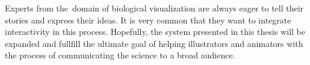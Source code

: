 \documentclass[
  digital, %
  table,   %
  nolof,     %
  nolot,     %
  oneside,
]{fithesis3}
\begin{document}
Experts from the domain of biological visualization are always eager to tell their stories and express their ideas. It is very common that they want to integrate interactivity in this process. Hopefully, the system presented in this thesis will be expanded and fullfill the ultimate goal of helping illustrators and animators with the process of communicating the science to a broad audience.


\newpage
\printbibliography[heading=bibintoc]

\end{document}
